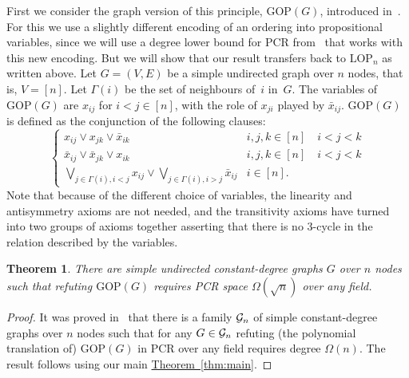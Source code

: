 \documentclass[11pt]{article}
\numberwithin{equation}{section}
\newtheorem{theorem}{Theorem}[section]
\theoremstyle{definition}
\theoremstyle{plain}
\newcommand{\expref}[2]{\hyperref[#2]{#1~\ref{#2}}}
\newcommand\LOP{\mathrm{LOP}}
\newcommand\GOP{\mathrm{GOP}}
\begin{document}
First we consider the graph version of this principle, $\GOP(G)$, introduced
in~\cite{DBLP:journals/siamcomp/SegerlindBI04}.
For this we use a slightly different encoding of an ordering into propositional variables,
since we will use a degree lower bound for PCR from~\cite{DBLP:journals/tocl/GalesiL10}
that works with this new encoding. But we will show that our result transfers back
to $\LOP_n$ as written above.
Let $G=(V,E)$ be a simple undirected graph over $n$ nodes, that is, $V=[n]$.
Let $\Gamma(i)$ be the set of neighbours of~$i$ in~$G$.
The variables of $\GOP(G)$ are $x_{ij}$ for $i<j \in [n]$, with the role of $x_{ji}$ played
by $\bar x_{ij}$. $\GOP(G)$ is defined as the conjunction of the following clauses:
$$
\left \{
\begin{array}{ll}
x_{ij} \vee x_{jk} \vee \bar x_{ik} &  i,j,k \in [n] \quad i<j<k  \\
\bar x_{ij} \vee \bar x_{jk} \vee x_{ik} &  i,j,k \in [n] \quad i<j<k \\
\bigvee_{j\in \Gamma(i), i<j} x_{ij} \vee \bigvee_{j\in \Gamma(i), i>j} \bar x_{ij} & i \in[n].
\end{array}
\right.
$$
Note that because of the different choice of variables, the linearity and antisymmetry axioms are not needed,
and the transitivity axioms have turned into
two groups of axioms together asserting
that there is no 3-cycle in the relation described by the variables. 


\begin{theorem}
\label{cor:GOP}
There are simple undirected constant-degree graphs $G$ over $n$ nodes such that refuting
$\GOP(G)$ requires PCR space $\Omega(\sqrt{n})$ over any field. 
\end{theorem}

\begin{proof}
It was proved in~\cite{DBLP:journals/tocl/GalesiL10} that there is a family ${\cal G}_n$ of simple constant-degree graphs over $n$ nodes such that  for any $G \in  {\cal G}_n$ 
refuting (the polynomial translation of) $\GOP(G)$ in PCR over any field  requires degree $\Omega(n)$.
The result follows using our main \expref{Theorem}{thm:main}.
\end{proof}
\end{document}

